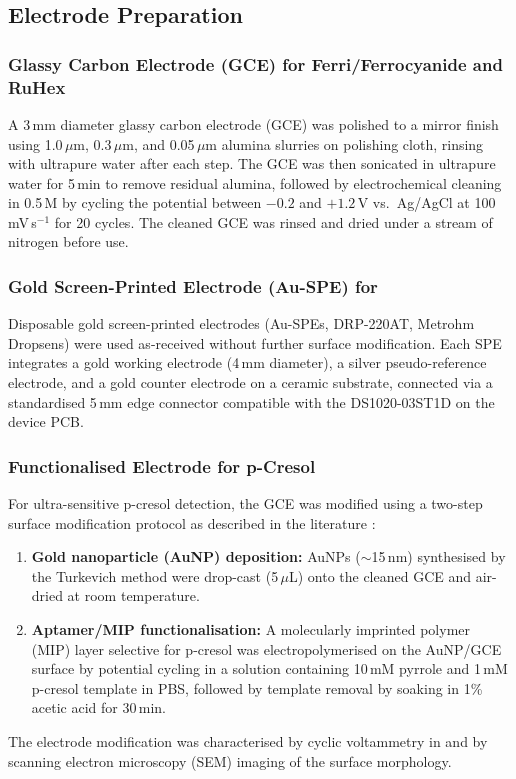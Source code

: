 \subsection{Electrode Preparation}

\subsubsection{Glassy Carbon Electrode (GCE) for Ferri/Ferrocyanide and RuHex}

A 3\,mm diameter glassy carbon electrode (GCE) was polished to a mirror finish using 1.0\,$\mu$m, 0.3\,$\mu$m, and 0.05\,$\mu$m alumina slurries on polishing cloth, rinsing with ultrapure water after each step. The GCE was then sonicated in ultrapure water for 5\,min to remove residual alumina, followed by electrochemical cleaning in 0.5\,M  by cycling the potential between $-0.2$ and $+1.2$\,V vs.\ Ag/AgCl at 100\,mV\,s$^{-1}$ for 20 cycles. The cleaned GCE was rinsed and dried under a stream of nitrogen before use.

\subsubsection{Gold Screen-Printed Electrode (Au-SPE) for }

Disposable gold screen-printed electrodes (Au-SPEs, DRP-220AT, Metrohm Dropsens) were used as-received without further surface modification. Each SPE integrates a gold working electrode (4\,mm diameter), a silver pseudo-reference electrode, and a gold counter electrode on a ceramic substrate, connected via a standardised 5\,mm edge connector compatible with the DS1020-03ST1D on the device PCB.

\subsubsection{Functionalised Electrode for p-Cresol}

For ultra-sensitive p-cresol detection, the GCE was modified using a two-step surface modification protocol as described in the literature \cite{Chandra2013}:
\begin{enumerate}
    \item \textbf{Gold nanoparticle (AuNP) deposition:} AuNPs ($\sim$15\,nm) synthesised by the Turkevich method were drop-cast (5\,$\mu$L) onto the cleaned GCE and air-dried at room temperature.
    \item \textbf{Aptamer/MIP functionalisation:} A molecularly imprinted polymer (MIP) layer selective for p-cresol was electropolymerised on the AuNP/GCE surface by potential cycling in a solution containing 10\,mM pyrrole and 1\,mM p-cresol template in PBS, followed by template removal by soaking in 1\% acetic acid for 30\,min.
\end{enumerate}
The electrode modification was characterised by cyclic voltammetry in \ferrocene{} and by scanning electron microscopy (SEM) imaging of the surface morphology.

